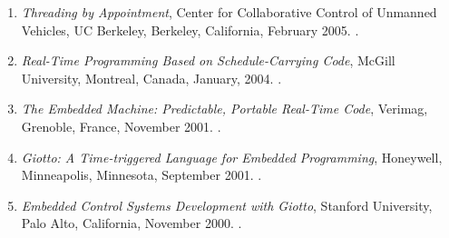 {\begin{enumerate}
\item \emph{Threading by Appointment},
Center for Collaborative Control of Unmanned Vehicles, UC Berkeley, Berkeley, California, February 2005.
.

\item \emph{Real-Time Programming Based on Schedule-Carrying Code},
McGill University, Montreal, Canada, January, 2004.
.

\item \emph{The Embedded Machine: Predictable, Portable Real-Time Code},
Verimag, Grenoble, France, November 2001.
.

\item \emph{Giotto: A Time-triggered Language for Embedded Programming},
Honeywell, Minneapolis, Minnesota, September 2001.
.

\item \emph{Embedded Control Systems Development with Giotto},
Stanford University, Palo Alto, California, November 2000.
.
\end{enumerate}
}